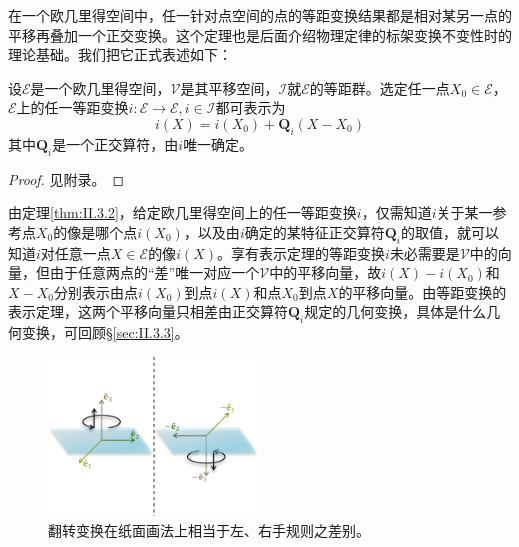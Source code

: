 \documentclass[../main.tex]{subfiles}
\begin{document}
在一个欧几里得空间中，任一针对点空间的点的等距变换结果都是相对某另一点的平移再叠加一个正交变换。这个定理也是后面介绍物理定律的标架变换不变性时的理论基础。我们把它正式表述如下：

\begin{theorem}[等距变换的表示定理]\label{thm:II.3.2}
    设$\mathcal{E}$是一个欧几里得空间，$\mathcal{V}$是其平移空间，$\mathcal{I}$就$\mathcal{E}$的等距群。选定任一点$X_0\in\mathcal{E}$，$\mathcal{E}$上的任一等距变换$i:\mathcal{E}\rightarrow\mathcal{E},i\in\mathcal{I}$都可表示为
    \[
        i\left(X\right)=i\left(X_0\right)+\mathbf{Q}_i\left(X-X_0\right)
    \]
    其中$\mathbf{Q}_i$是一个正交算符，由$i$唯一确定。
\end{theorem}
\begin{proof}
    见附录。
\end{proof}

由定理\ref{thm:II.3.2}，给定欧几里得空间上的任一等距变换$i$，仅需知道$i$关于某一参考点$X_0$的像是哪个点$i\left(X_0\right)$，以及由$i$确定的某特征正交算符$\mathbf{Q}_i$的取值，就可以知道$i$对任意一点$X\in\mathcal{E}$的像$i\left(X\right)$。享有表示定理的等距变换$i$未必需要是$\mathcal{V}$中的向量，但由于任意两点的“差”唯一对应一个$\mathcal{V}$中的平移向量，故$i\left(X\right)-i\left(X_0\right)$和$X-X_0$分别表示由点$i\left(X_0\right)$到点$i\left(X\right)$和点$X_0$到点$X$的平移向量。由等距变换的表示定理，这两个平移向量只相差由正交算符$\mathbf{Q}_i$规定的几何变换，具体是什么几何变换，可回顾\S\ref{sec:II.3.3}。

\begin{figure}[ht]
    \centering
    \includegraphics[width=0.5\textwidth]{images/II.3.3.pdf}
    \caption{翻转变换在纸面画法上相当于左、右手规则之差别。}
    \label{fig:II.3.4}
\end{figure}
\end{document}
